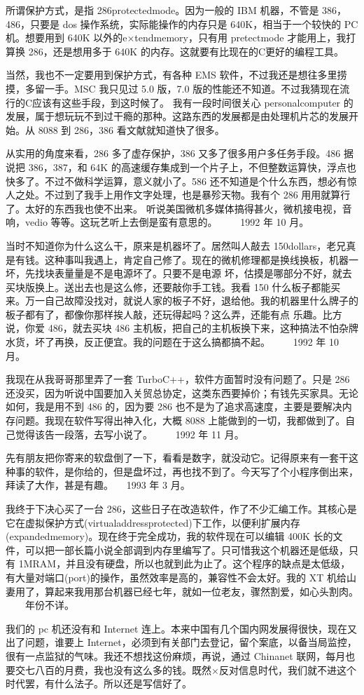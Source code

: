 所谓保护方式，是指 286protectedmode。因为一般的 IBM 机器，不管是 386，486，只要是 dos 操作系统，实际能操作的内存只是 640K，相当于一个较快的 PC 机。想要用到 640K 以外的e×tendmemory，只有用 pretectmode 才能用上，我打算换 286，还是想用多于 640K 的内存。这就要有比现在的C更好的编程工具。

当然，我也不一定要用到保护方式，有各种 EMS 软件，不过我还是想往多里捞摸，多留一手。MSC 我只见过 5.0 版，7.0 版的性能还不知道。不过我猜现在流行的C应该有这些手段，到这时候了。 我有一段时间很关心 personalcomputer 的发展，属于想玩玩不到过干瘾的那种。这路东西的发展都是由处理机片芯的发展开始。从 8088 到 286，386 看文献就知道快了很多。

从实用的角度来看，286 多了虚存保护，386 又多了很多用户多任务手段。486 据说把 386，387，和 64K 的高速缓存集成到一个片子上，不但整数运算快，浮点也快多了。不过不做科学运算，意义就小了。586 还不知道是个什么东西，想必有惊人之处。不过到了我手上用作文字处理，也是暴殄天物。我有个 286 用用就算行了。太好的东西我也使不出来。 听说美国微机多媒体搞得甚火，微机接电视，音响，vedio 等等。这玩艺听上去倒是蛮有意思的。
　　1992 年 10 月。

当时不知道你为什么这么干，原来是机器坏了。居然叫人敲去 150dollars，老兄真是有钱。这种事叫我遇上，肯定自己修了。现在的微机修理都是换线换板，机器一坏，先找块表量量是不是电源坏了。只要不是电源 坏，估摸是哪部分不好，就去买块版换上。送出去也是这么修，还要敲你手工钱。我看 150 什么板子都能买来。万一自己故障没找对，就说人家的板子不好，退给他。我的机器里什么牌子的板子都有了，都像你那样挨人敲，还玩得起吗？这么弄，还能有点 乐趣。比方说，你爱 486，就去买块 486 主机板，把自己的主机板换下来，这种搞法不怕杂牌水货，坏了再换，反正便宜。我的问题在于这么搞都搞不起。
　　1992 年 10 月。

我现在从我哥哥那里弄了一套 TurboC++，软件方面暂时没有问题了。只是 286 还没买，因为听说中国要加入关贸总协定，这类东西要掉价；有钱先买家具。无论如何，我是用不到 486 的，因为要 286 也不是为了追求高速度，主要是要解决内存问题。我现在软件写得出神入化，大概 8088 上能做到的一切，我都做到了。自己觉得该告一段落，去写小说了。
　　1992 年 11 月。

先有朋友把你寄来的软盘倒了一下，看看是数字，就没动它。记得原来有一套干这种事的软件，是你给的，但是盘坏过，再也找不到了。今天写了个小程序倒出来，拜读了大作，甚是有趣。
　1993 年 3 月。

我终于下决心买了一台 286，这些日子在改造软件，作了不少汇编工作。其核心是它在虚拟保护方式(virtualaddressprotected)下工作，以便利扩展内存 (expandedmemory)。现在终于完全成功，我的软件现在可以编辑 400K 长的文件，可以把一部长篇小说全部调到内存里编写了。只可惜我这个机器还是低级，只有 1MRAM，并且没有硬盘，所以也就到此为止了。这个程序的缺点是太低级，有大量对端口(port)的操作，虽然效率是高的，兼容性不会太好。我的 XT 机给山妻用了，算起来我用那台机器已经七年，就如一位老友，骤然割爱，如心头割肉。
　　年份不详。

我们的 pc 机还没有和 Internet 连上。本来中国有几个国内网发展得很快，现在又出了问题，谁要上 Internet，必须到有关部门去登记，留个案底，以备当局监控，很有一点监狱的气味。我还不想找这份麻烦，再说，通过 Chinanet 联网，每月也要交七八百的月费，我也没有这么多的钱。既然×反对信息时代，我们就不进这个时代罢，有什么法子。所以还是写信好了。
